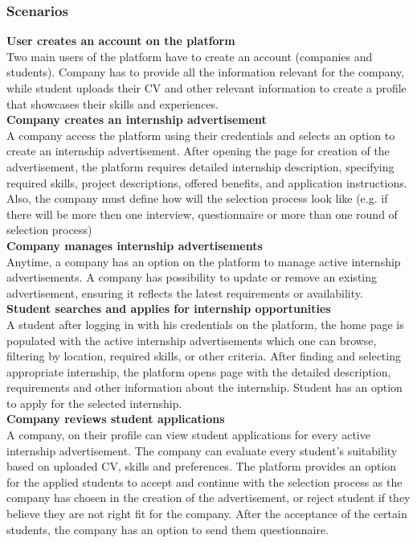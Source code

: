\subsubsection{Scenarios}

\quad \textbf{User creates an account on the platform}\\ 
Two main users of the platform have to create an account (companies and students). Company has to provide all the information relevant for the company, while student uploads their CV and other relevant information to create a profile that showcases their skills and experiences.\\

\textbf{Company creates an internship advertisement}\\
A company access the platform using their credentials and selects an option to create an internship advertisement. After opening the page for creation of the advertisement, the platform requires detailed internship description, specifying required skills, project descriptions, offered benefits, and application instructions. Also, the company must define how will the selection process look like (e.g. if there will be more then one interview, questionnaire or more than one round of selection process)  \\

\textbf{Company manages internship advertisements}\\
Anytime, a company has an option on the platform to manage active internship advertisements. A company has possibility to update or remove an existing advertisement, ensuring it reflects the latest requirements or availability.\\

\textbf{Student searches and applies for internship opportunities }\\
A student after logging in with his credentials on the platform, the home page is populated with the active internship advertisements which one can browse, filtering by location, required skills, or other criteria. After finding and selecting appropriate internship, the platform opens page with the detailed description, requirements and other information about the internship. Student has an option to apply for the selected internship.\\

\textbf{Company reviews student applications}\\
A company, on their profile can view student applications for every active internship advertisement. The company can evaluate every student's suitability based on uploaded CV, skills and preferences. The platform provides an option for the applied students to accept and continue with the selection process as the company has chosen in the creation of the advertisement, or reject student if they believe they are not right fit for the company. After the acceptance of the certain students, the company has an option to send them questionnaire. \\

